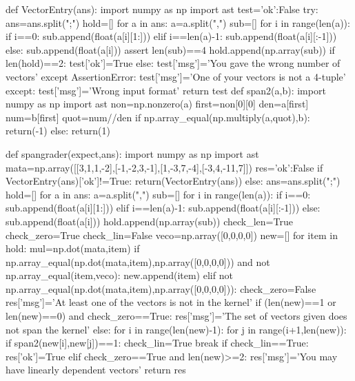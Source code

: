 
\begin{edXscript}

def VectorEntry(ans):
    import numpy as np
    import ast
    test={'ok':False}
    try:
        ans=ans.split(";")
        hold=[]
        for a in ans:
            a=a.split(",")
            sub=[]
            for i in range(len(a)):
                if i==0:
                    sub.append(float(a[i][1:]))
                elif i==len(a)-1:
                    sub.append(float(a[i][:-1]))
                else:
                    sub.append(float(a[i]))
            assert len(sub)==4
            hold.append(np.array(sub))
        if len(hold)==2:
            test['ok']=True
        else:
            test['msg']='You gave the wrong number of vectors'        
    except AssertionError:
        test['msg']='One of your vectors is not a 4-tuple'
    except:
        test['msg']='Wrong input format'
    return test  
def span2(a,b):
    import numpy as np
    import ast
    non=np.nonzero(a)
    first=non[0][0]
    den=a[first]
    num=b[first]
    quot=num//den
    if np.array_equal(np.multiply(a,quot),b):
        return(-1)
    else:
        return(1)
        
def spangrader(expect,ans):
    import numpy as np
    import ast
    mata=np.array([[3,1,1,-2],[-1,-2,3,-1],[1,-3,7,-4],[-3,4,-11,7]])
    res={'ok':False}
    if VectorEntry(ans)['ok']!=True:
        return(VectorEntry(ans))
    else:
        ans=ans.split(";")
        hold=[]
        for a in ans:
            a=a.split(",")
            sub=[]
            for i in range(len(a)):
                if i==0:
                    sub.append(float(a[i][1:]))
                elif i==len(a)-1:
                    sub.append(float(a[i][:-1]))
                else:
                    sub.append(float(a[i]))
            hold.append(np.array(sub))
        check_len=True
        check_zero=True
        check_lin=False
        veco=np.array([0,0,0,0])
        new=[]
        for item in hold:
            mul=np.dot(mata,item)
            if np.array_equal(np.dot(mata,item),np.array([0,0,0,0])) and not np.array_equal(item,veco):
                new.append(item)
            elif not np.array_equal(np.dot(mata,item),np.array([0,0,0,0])):
                check_zero=False
                res['msg']='At least one of the vectors is not in the kernel'
        if (len(new)==1 or len(new)==0) and check_zero==True:
            res['msg']='The set of vectors given does not span the kernel'
        else:
            for i in range(len(new)-1):
                for j in range(i+1,len(new)):
                    if span2(new[i],new[j])==1:
                        check_lin=True
                        break
            if check_lin==True:
                res['ok']=True
            elif check_zero==True and len(new)>=2:
                res['msg']='You may have linearly dependent vectors'
        return res

\end{edXscript}
